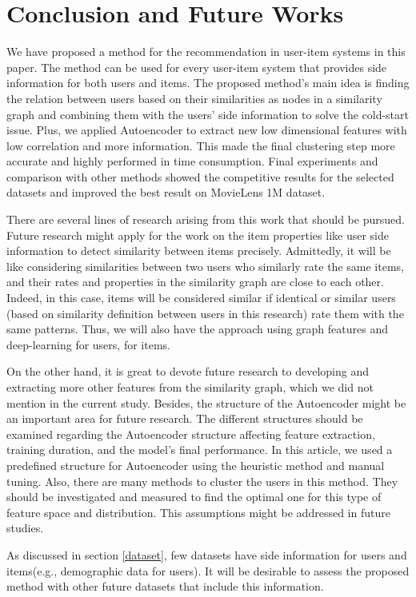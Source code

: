 \documentclass[a4paper,fleqn]{cas-dc}
\begin{document}
\section{Conclusion and Future Works}
\label{conclusion}
We have proposed a method for the recommendation in user-item systems in this paper. The method can be used for every user-item system that provides side information for both users and items. The proposed method's main idea is finding the relation between users based on their similarities as nodes in a similarity graph and combining them with the users' side information to solve the cold-start issue. Plus, we applied Autoencoder to extract new low dimensional features with low correlation and more information. This made the final clustering step more accurate and highly performed in time consumption. Final experiments and comparison with other methods showed the competitive results for the selected datasets and improved the best result on MovieLens 1M dataset.

There are several lines of research arising from this work that should be pursued. Future research might apply for the work on the item properties like user side information to detect similarity between items precisely. Admittedly, it will be like considering similarities between two users who similarly rate the same items, and their rates and properties in the similarity graph are close to each other. Indeed, in this case, items will be considered similar if identical or similar users (based on similarity definition between users in this research) rate them with the same patterns. Thus, we will also have the approach using graph features and deep-learning for users, for items.

On the other hand, it is great to devote future research to developing and extracting more other features from the similarity graph, which we did not mention in the current study.
Besides, the structure of the Autoencoder might be an important area for future research. The different structures should be examined regarding the Autoencoder structure affecting feature extraction, training duration, and the model's final performance. In this article, we used a predefined structure for Autoencoder using the heuristic method and manual tuning. Also, there are many methods to cluster the users in this method. They should be investigated and measured to find the optimal one for this type of feature space and distribution. This assumptions might be addressed in future studies.

As discussed in section \ref{dataset}, few datasets have side information for users and items(e.g., demographic data for users). It will be desirable to assess the proposed method with other future datasets that include this information.

\printcredits



\end{document}
